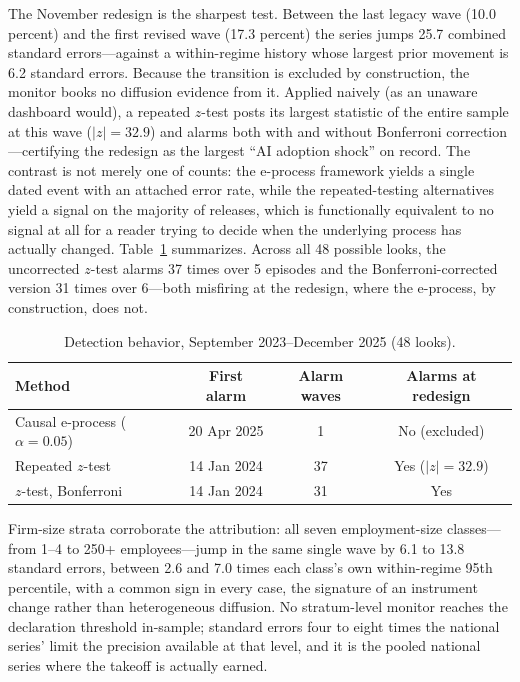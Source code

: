 \documentclass[preprint,12pt]{elsarticle}
\begin{document}
The November redesign is the sharpest test. Between the last legacy wave (10.0 percent) and the first revised wave (17.3 percent) the series jumps 25.7 combined standard errors---against a within-regime history whose largest prior movement is 6.2 standard errors. Because the transition is excluded by construction, the monitor books no diffusion evidence from it. Applied naively (as an unaware dashboard would), a repeated $z$-test posts its largest statistic of the entire sample at this wave ($|z|=32.9$) and alarms both with and without Bonferroni correction---certifying the redesign as the largest ``AI adoption shock'' on record. The contrast is not merely one of counts: the e-process framework yields a single dated event with an attached error rate, while the repeated-testing alternatives yield a signal on the majority of releases, which is functionally equivalent to no signal at all for a reader trying to decide when the underlying process has actually changed. Table~\ref{tab:comp} summarizes. Across all 48 possible looks, the uncorrected $z$-test alarms 37 times over 5 episodes and the Bonferroni-corrected version 31 times over 6---both misfiring at the redesign, where the e-process, by construction, does not.

\begin{table}[t]
\centering
\caption{Detection behavior, September 2023--December 2025 (48 looks).}
\label{tab:comp}
\small
\begin{tabular}{lccc}
\toprule
Method & First alarm & Alarm waves & Alarms at redesign \\
\midrule
Causal e-process ($\alpha=0.05$) & 20 Apr 2025 & 1 & No (excluded) \\
Repeated $z$-test & 14 Jan 2024 & 37 & Yes ($|z|=32.9$) \\
$z$-test, Bonferroni & 14 Jan 2024 & 31 & Yes \\
\bottomrule
\end{tabular}
\end{table}

Firm-size strata corroborate the attribution: all seven employment-size classes---from 1--4 to 250+ employees---jump in the same single wave by 6.1 to 13.8 standard errors, between 2.6 and 7.0 times each class's own within-regime 95th percentile, with a common sign in every case, the signature of an instrument change rather than heterogeneous diffusion. No stratum-level monitor reaches the declaration threshold in-sample; standard errors four to eight times the national series' limit the precision available at that level, and it is the pooled national series where the takeoff is actually earned.
\end{document}
